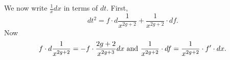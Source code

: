 \documentclass[draft, 11pt]{article} %
\theoremstyle{plain}
\theoremstyle{remark}
\DeclareMathOperator{\ord}{ord}
\begin{document}
We now write $\frac{1}{x}dx$ in terms of $dt$.
First, 
\[
dt^2 = f\cdot d\frac{1}{x^{2g+2}} + \frac{1}{x^{2g+2}} \cdot df.
\]
Now 
\[
f\cdot d\frac{1}{x^{2g+2}} = -f\cdot \frac{2g+2}{x^{2g+3}} dx \ {\rm and}\ \frac{1}{x^{2g+2}} \cdot df = \frac{1}{x^{2g+2}}\cdot f' \cdot dx.
\]
\begin{comment}
So in total 
\[
dt^2 = \left (\frac{(2g+1)\cdot f}{x^{2g+3}} - \frac{f'}{x^{2g+2}} \right ) dx.
\]

Finally, we have $\frac{1}{x}dx = \frac {2\cdot x^{2g+1}}{\left ( (2g+1)\cdot \frac{f}{x} - f' \right )} \cdot t dt$.

Let $h(x) = (2g+1)\cdot \frac{f}{x} - f'$.
Note that $\deg(h(x)) = 2g-1$ since we assumed that $a_{2g}\neq 0$.
Hence $\ord_{P_\infty}\left ( \frac{2\cdot x^{2g+1}}{h(x)} \right ) = -2(2g+1) + 2(2g-1) = -4$.
We want to compute the coefficent of $t^{-2}$ in the laurent series of this.
This is because the residue of $\frac{1}{x}dx$ is the coefficient of $t^{-1}$ in $\frac{2x^{2g+1}}{h(x)}\cdot t$, which is the coefficient of $t^{-2}$ in $\frac{2x^{2g+1}}{h(x)}$.


Note that 
\begin{eqnarray}\label{h(x)}
h(x) & = & \left( \frac{a_{2g}(2g+1)x^{2g-1}}{x^{2g+1}} - \frac{2g\cdot a_{2g}\cdot x^{2g-1}}{x^{2g+1}} \right) \nonumber \\
& ~ & + \left(\frac{a_{2g-1}\cdot(2g+1)\cdot x^{2g-2}}{x^{2g+1}} - \frac{(2g-1)\cdot a_{2g-1} \cdot x^{2g-2}}{x^{2g+1}} \right) + \ldots \nonumber \\
& = & \frac{a_{2g}}{x^2} + \frac{2\cdot a_{2g-1}}{x^3} + \ldots
\end{eqnarray}

Also note that 
\begin{eqnarray}\label{t^4}
t^4 & = & \frac{f(x)^2}{x^{4g+4}} \nonumber \\
& = & \frac{a_{2g+1}^2 x^{4g+2}}{x^{4g+4}} + \frac{2\cdot a_{2g}\cdot a_{2g+1} \cdot x^{4g+1}}{x^{4g+4}} + \ldots \nonumber \\
& = & \frac{a_{2g+1}^2}{x^2} + \frac{2\cdot a_{2g} \cdot a_{2g+1}}{x^3} + \ldots
\end{eqnarray}

So if we write $h(x) = \sum_{i\geq 4} c_i t^i$ then we must have $c_4 = \frac{a_{2g}}{a_{2g+1}^2}$ in order that the coefficients of $\frac{1}{x^2}$ are equal.

We now compute the $c_6$ expansions of $h(x)$.

We know that the lead term of $t^6 = \frac{f(x)^3}{x^{6g+6}}$ is $\frac{2a_{2g}^2}{a_{2g+1}x^3}$.
So $c_6$ must satisfy
\[
\frac{2a_{2g-1}}{x^3} = \frac{c_4\cdot 2 \cdot a_{2g} \cdot a_{2g+1}}{x^3} + \frac{c_6 \cdot a_{2g+1}^3}{x^3},
\]
from \eqref{h(x)} and \eqref{t^4}.


\end{comment}
\end{document}
